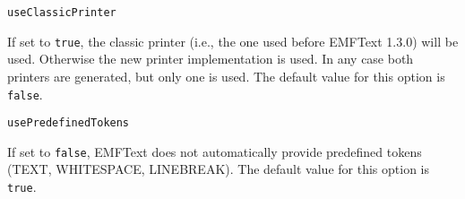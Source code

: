 \noindent\texttt{useClassicPrinter}
\begin{myindentpar}{1cm}
If set to \texttt{true}, the classic printer (i.e., the one used before EMFText 1.3.0) will be used. Otherwise the new printer implementation is used. In any case both printers are generated, but only one is used. The default value for this option is \texttt{false}.
\end{myindentpar}

\noindent\texttt{usePredefinedTokens}
\begin{myindentpar}{1cm}
If set to \texttt{false}, EMFText does not automatically provide predefined tokens (TEXT, WHITESPACE, LINEBREAK). The default value for this option is \texttt{true}.
\end{myindentpar}

